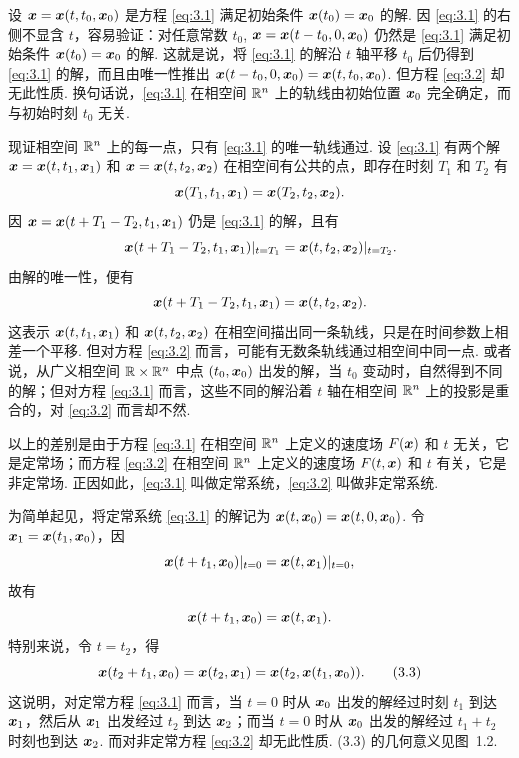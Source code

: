 设 $\boldsymbol{x} = \boldsymbol{x}(t, t_0, \boldsymbol{x}_0)$ 是方程 \eqref{eq:3.1} 满足初始条件 $\boldsymbol{x}(t_0) = \boldsymbol{x}_0$ 的解. 因 \eqref{eq:3.1} 的右侧不显含 $t$，容易验证：对任意常数 $t_0$, $\boldsymbol{x} = \boldsymbol{x}(t - t_0, 0, \boldsymbol{x}_0)$ 仍然是 \eqref{eq:3.1} 满足初始条件 $\boldsymbol{x}(t_0) = \boldsymbol{x}_0$ 的解. 这就是说，将 \eqref{eq:3.1} 的解沿 $t$ 轴平移 $t_0$ 后仍得到 \eqref{eq:3.1} 的解，而且由唯一性推出 $\boldsymbol{x}(t - t_0, 0, \boldsymbol{x}_0) = \boldsymbol{x}(t, t_0, \boldsymbol{x}_0)$. 但方程 \eqref{eq:3.2} 却无此性质. 换句话说，\eqref{eq:3.1} 在相空间 $\mathbb{R}^n$ 上的轨线由初始位置 $\boldsymbol{x}_0$ 完全确定，而与初始时刻 $t_0$ 无关.

现证相空间 $\mathbb{R}^n$ 上的每一点，只有 \eqref{eq:3.1} 的唯一轨线通过. 设 \eqref{eq:3.1} 有两个解 $\boldsymbol{x} = \boldsymbol{x}(t, t_1, \boldsymbol{x}_1)$ 和 $\boldsymbol{x} = \boldsymbol{x}(t, t_2, \boldsymbol{x}_2)$ 在相空间有公共的点，即存在时刻 $T_1$ 和 $T_2$ 有
\[
\boldsymbol{x}(T_1, t_1, \boldsymbol{x}_1) = \boldsymbol{x}(T_2, t_2, \boldsymbol{x}_2).
\]
因 $\boldsymbol{x} = \boldsymbol{x}(t + T_1 - T_2, t_1, \boldsymbol{x}_1)$ 仍是 \eqref{eq:3.1} 的解，且有
\[
\boldsymbol{x}(t + T_1 - T_2, t_1, \boldsymbol{x}_1)|_{t = T_1} = \boldsymbol{x}(t, t_2, \boldsymbol{x}_2)|_{t = T_2}.
\]
由解的唯一性，便有
\[
\boldsymbol{x}(t + T_1 - T_2, t_1, \boldsymbol{x}_1) = \boldsymbol{x}(t, t_2, \boldsymbol{x}_2).
\]
这表示 $\boldsymbol{x}(t, t_1, \boldsymbol{x}_1)$ 和 $\boldsymbol{x}(t, t_2, \boldsymbol{x}_2)$ 在相空间描出同一条轨线，只是在时间参数上相差一个平移. 但对方程 \eqref{eq:3.2} 而言，可能有无数条轨线通过相空间中同一点. 或者说，从广义相空间 $\mathbb{R} \times \mathbb{R}^n$ 中点 $(t_0, \boldsymbol{x}_0)$ 出发的解，当 $t_0$ 变动时，自然得到不同的解；但对方程 \eqref{eq:3.1} 而言，这些不同的解沿着 $t$ 轴在相空间 $\mathbb{R}^n$ 上的投影是重合的，对 \eqref{eq:3.2} 而言却不然.

以上的差别是由于方程 \eqref{eq:3.1} 在相空间 $\mathbb{R}^n$ 上定义的速度场 $F(\boldsymbol{x})$ 和 $t$ 无关，它是定常场；而方程 \eqref{eq:3.2} 在相空间 $\mathbb{R}^n$ 上定义的速度场 $F(t, \boldsymbol{x})$ 和 $t$ 有关，它是非定常场. 正因如此，\eqref{eq:3.1} 叫做定常系统，\eqref{eq:3.2} 叫做非定常系统.

为简单起见，将定常系统 \eqref{eq:3.1} 的解记为 $\boldsymbol{x}(t, \boldsymbol{x}_0) = \boldsymbol{x}(t, 0, \boldsymbol{x}_0)$. 令 $\boldsymbol{x}_1 = \boldsymbol{x}(t_1, \boldsymbol{x}_0)$，因
\[
\boldsymbol{x}(t + t_1, \boldsymbol{x}_0)|_{t = 0} = \boldsymbol{x}(t, \boldsymbol{x}_1)|_{t = 0},
\]
故有
\[
\boldsymbol{x}(t + t_1, \boldsymbol{x}_0) = \boldsymbol{x}(t, \boldsymbol{x}_1).
\]
特别来说，令 $t = t_2$，得
\[
\boldsymbol{x}(t_2 + t_1, \boldsymbol{x}_0) = \boldsymbol{x}(t_2, \boldsymbol{x}_1) = \boldsymbol{x}(t_2, \boldsymbol{x}(t_1, \boldsymbol{x}_0)). \tag{3.3}\label{eq:3.3}
\]
这说明，对定常方程 \eqref{eq:3.1} 而言，当 $t = 0$ 时从 $\boldsymbol{x}_0$ 出发的解经过时刻 $t_1$ 到达 $\boldsymbol{x}_1$，然后从 $\boldsymbol{x}_1$ 出发经过 $t_2$ 到达 $\boldsymbol{x}_2$；而当 $t = 0$ 时从 $\boldsymbol{x}_0$ 出发的解经过 $t_1 + t_2$ 时刻也到达 $\boldsymbol{x}_2$. 而对非定常方程 \eqref{eq:3.2} 却无此性质. (3.3) 的几何意义见图~1.2.

